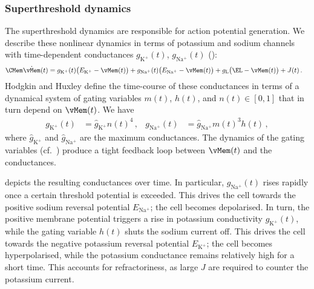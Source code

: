 \subsubsection{Superthreshold dynamics}
The superthreshold dynamics are responsible for action potential generation.
We describe these nonlinear dynamics in terms of potassium and sodium channels with time-dependent conductances $g_\mathrm{K^+}(t)$, $g_\mathrm{Na^+}(t)$ ():
\begin{align*}
	\CMem \dot\vMem(t) &=
		  g_\mathrm{K^+}(t) \bigl(E_\mathrm{K^+} - \vMem(t)\bigr)
		+ g_\mathrm{Na^+}(t) \bigl(E_\mathrm{Na^+} - \vMem(t)\bigr)
		+ g_\mathrm{L} \bigl(\EL - \vMem(t)\bigr) + J(t) \,.
\end{align*}
Hodgkin and Huxley define the time-course of these conductances in terms of a dynamical system of gating variables $m(t)$, $h(t)$, and $n(t) \in [0, 1]$ that in turn depend on $\vMem(t)$.
We have
\begin{align*}
	g_\mathrm{K^+}(t) &= \hat g_\mathrm{K^+} n(t)^4 \,, &
	g_\mathrm{Na^+}(t) &= \hat g_\mathrm{Na^+} m(t)^3 h(t) \,,
\end{align*}
where $\hat g_\mathrm{K^+}$ and $\hat g_\mathrm{Na^+}$ are the maximum conductances.
The dynamics of the gating variables (cf.~) produce a tight feedback loop between $\vMem(t)$ and the conductances.

 depicts the resulting conductances over time.
In particular, $g_\mathrm{Na^+}(t)$ rises rapidly once a certain threshold potential is exceeded.
This drives the cell towards the positive sodium reversal potential $E_\mathrm{Na^+}$; the cell becomes depolarised.
In turn, the positive membrane potential triggers a rise in potassium conductivity $g_\mathrm{K^+}(t)$, while the gating variable $h(t)$ shuts the sodium current off. This drives the cell towards the negative potassium reversal potential $E_\mathrm{K^+}$; the cell becomes hyperpolarised, while the potassium conductance remains relatively high for a short time.
This accounts for refractoriness, as large $J$ are required to counter the potassium current.

